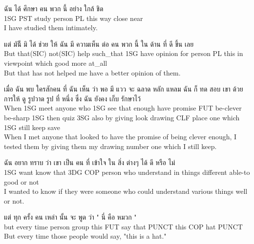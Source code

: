 \documentclass{book}
\begin{document}
	\begin{exe}
		\ex
		\gll ฉัน ได้ ศึกษา คน พวก นี้ อย่าง ใกล้ ชิด\\
		\textsc{1SG} \textsc{PST} study person \textsc{PL} this way close near\\
		I have studied them intimately.
	\end{exe}

	\begin{exe}
		\ex
		\gll แต่ มัน็้ มิ ได้ ช่วย ให้ ฉัน มี ความเห็น ต่อ คน พวก นี้ ใน ด้าน ที่ ดี ขึ้น เลย\\
		But that(SIC) not(SIC) help such\_that \textsc{1SG} have opinion for person \textsc{PL} this in viewpoint which good more at\_all\\
		But that has not helped me have a better opinion of them.
	\end{exe}

	\begin{exe}
		\ex
		\gll เมื่อ ฉัน พบ ใครสักคน ที่ ฉัน เห็น ว่า พอ มี แวว จะ ฉลาด หลัก แหลม ฉัน ก็ ทด สอบ เขา ด้วย การให้ ดู รูปวาด รูป ที่ หนึ่ง ซึ่ง ฉัน ยังคง เก็บ รักษาไว้\\
		When \textsc{1SG} meet anyone who \textsc{1SG} see that enough have promise \textsc{FUT} be-clever  be-sharp \textsc{1SG} then quiz \textsc{3SG} also by giving look drawing \textsc{CLF} place one which \textsc{1SG} still keep save\\
		When I met anyone that looked to have the promise of being clever enough, I tested them by giving them my drawing number one which I still keep.
	\end{exe}

	\begin{exe}
		\ex 
		\gll ฉัน อยาก ทราบ ว่า เขา เป็น คน ที่ เข้าใจ ใน สิ่ง ต่างๆ ได้ ดี หรือ ไม่\\
		\textsc{1SG} want know that \textsc{3DG} \textsc{COP} person who understand in things different able-to good or not\\
		I wanted to know if they were someone who could understand various things well or not.
	\end{exe}

	\begin{exe}
		\ex 
		\gll แต่ ทุก ครั้ง คน เหล่า นั้น จะ พูด ว่า " นี่ คือ หมวก "\\
		but every time person group this \textsc{FUT} say that \textsc{PUNCT} this \textsc{COP} hat \textsc{PUNCT}\\
		But every time those people would say, "this is a hat."
	\end{exe}
\end{document}
